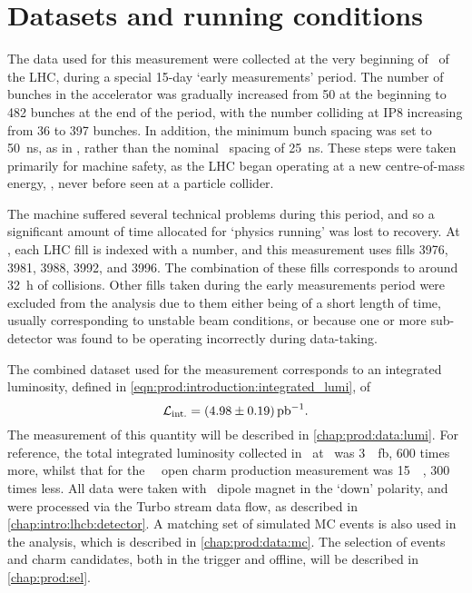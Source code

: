 \chapter{Datasets and running conditions}
\label{chap:prod:data}

The data used for this measurement were collected at the very beginning of 
\runtwo\ of the \ac{LHC}, during a special 15-day `early measurements' period.
The number of bunches in the accelerator was gradually increased from 50 at the 
beginning to 482 bunches at the end of the period, with the number colliding at 
IP8 increasing from 36 to 397 bunches.
In addition, the minimum bunch spacing was set to \SI{50}{\nano\second}, as in 
\runone, rather than the nominal \runtwo\ spacing of \SI{25}{\nano\second}.
These steps were taken primarily for machine safety, as the \ac{LHC} began 
operating at a new centre-of-mass energy, , never before seen at a 
particle collider.

The machine suffered several technical problems during this period, and so a 
significant amount of time allocated for `physics running' was lost to 
recovery.
At \lhcb, each \ac{LHC} fill is indexed with a number, and this measurement 
uses fills 3976, 3981, 3988, 3992, and 3996.
The combination of these fills corresponds to around \SI{32}{\hour} of 
collisions.
Other fills taken during the early measurements period were excluded from the 
analysis due to them either being of a short length of time, usually 
corresponding to unstable beam conditions, or because one or more sub-detector 
was found to be operating incorrectly during data-taking.

The combined dataset used for the measurement corresponds to an integrated 
luminosity, defined in \cref{eqn:prod:introduction:integrated_lumi}, of
\begin{equation}
  \intlumi = \SI{\xsectotlumi}{\per\pico\barn}.
  \label{eqn:prod:xsectotlumi}
\end{equation}
The measurement of this quantity will be described in 
\cref{chap:prod:data:lumi}.
For reference, the total integrated luminosity collected in \runone\ at \lhcb\ 
was \SI{3}{\per\femto\barn}, 600 times more, whilst that for the \ 
\lhcb\ open charm production measurement was \SI{15}{\per\nb}, 300 times less.
All data were taken with \lhcb\ dipole magnet in the `down' polarity, and were 
processed via the Turbo stream data flow, as described in 
\cref{chap:intro:lhcb:detector}.
A matching set of simulated \ac{MC} events is also used in the analysis, which 
is described in \cref{chap:prod:data:mc}.
The selection of events and charm candidates, both in the trigger and offline, 
will be described in \cref{chap:prod:sel}.

